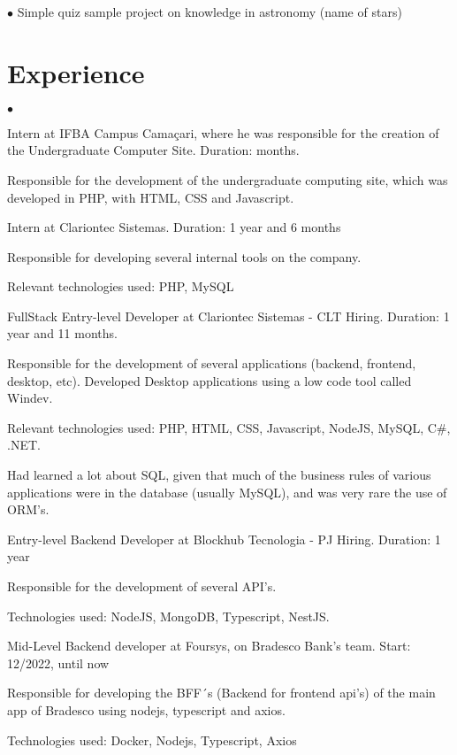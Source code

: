 \documentclass[margin,line]{res}
\newenvironment{list2}{
 \begin{list}{$\bullet$}{%
     \setlength{\itemsep}{0in}
     \setlength{\parsep}{0in} \setlength{\parskip}{0in}
     \setlength{\topsep}{0in} \setlength{\partopsep}{0in}
     \setlength{\leftmargin}{0.2in}}}{\end{list}}
\begin{document}
\begin{resume}
\begin{list2}
    Simple quiz sample project on knowledge in astronomy (name of stars)
\end{list2}
\vspace{0.2cm}
\section{Experience}
\begin{list2}
\item Intern at IFBA Campus Camaçari, where he was responsible for the creation of the Undergraduate Computer Site. Duration: months.

    Responsible for the development of the undergraduate computing site, which was developed in PHP, with HTML, CSS and Javascript.

\item Intern at Clariontec Sistemas. Duration: 1 year and 6 months

	Responsible for developing several internal tools on the company.
	
	Relevant technologies used: PHP, MySQL

\item FullStack Entry-level Developer at Clariontec Sistemas - CLT Hiring. Duration: 1 year and 11 months.

    Responsible for the development of several applications (backend, frontend, desktop, etc). Developed Desktop applications using a low code tool called Windev.

    Relevant technologies used: PHP, HTML, CSS, Javascript, NodeJS, MySQL, C\#, .NET.

    Had learned a lot about SQL, given that much of the business rules of various applications were in the database (usually MySQL), and was very rare the use of ORM's.

\item Entry-level Backend Developer at Blockhub Tecnologia - PJ Hiring. Duration: 1 year

    Responsible for the development of several API's.

    Technologies used: NodeJS, MongoDB, Typescript, NestJS.

\item Mid-Level Backend developer at Foursys, on Bradesco Bank's team. Start: 12/2022, until now

	Responsible for developing the BFF´s (Backend for frontend api's) of the main app of Bradesco using nodejs, typescript and axios.
	
	Technologies used: Docker, Nodejs, Typescript, Axios


\end{list2}
\end{resume}
\end{document}
